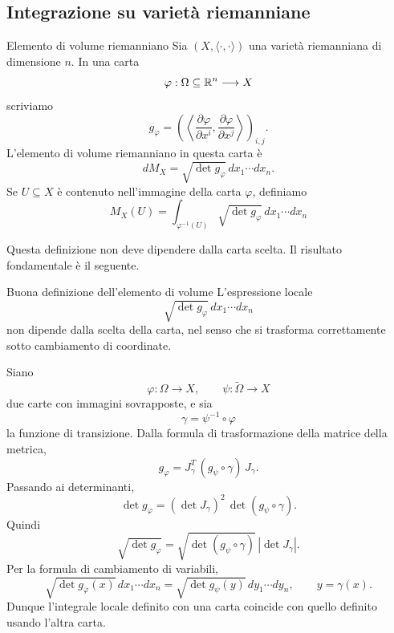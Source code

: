 \documentclass[a4paper]{article}
\begin{document}
\subsection{Integrazione su varietà riemanniane}

\begin{snippetdefinition}{Elemento di volume riemanniano}
Sia \((X,\langle\cdot,\cdot\rangle)\) una varietà riemanniana di dimensione \(n\). In una carta
\[
    \varphi:\Omega\subseteq\mathbb{R}^n\longrightarrow X
\]
scriviamo
\[
    g_\varphi
    =
    \left(
        \left\langle
            \frac{\partial\varphi}{\partial x^i},
            \frac{\partial\varphi}{\partial x^j}
        \right\rangle
    \right)_{i,j}.
\]
L'elemento di volume riemanniano in questa carta è
\[
    dM_X
    =
    \sqrt{\det g_\varphi}\,dx_1\cdots dx_n.
\]
Se \(U\subseteq X\) è contenuto nell'immagine della carta \(\varphi\), definiamo
\[
    M_X(U)
    =
    \int_{\varphi^{-1}(U)} \sqrt{\det g_\varphi}\,dx_1\cdots dx_n
\]
\end{snippetdefinition}

Questa definizione non deve dipendere dalla carta scelta. Il risultato fondamentale è il seguente.

\begin{snippetproposition}{Buona definizione dell'elemento di volume}
L'espressione locale
\[
    \sqrt{\det g_\varphi}\,dx_1\cdots dx_n
\]
non dipende dalla scelta della carta, nel senso che si trasforma correttamente sotto cambiamento di coordinate.
\end{snippetproposition}

\begin{snippetproof}{}
Siano
\[
    \varphi:\Omega\longrightarrow X,
    \qquad
    \psi:\widetilde{\Omega}\longrightarrow X
\]
due carte con immagini sovrapposte, e sia
\[
    \gamma=\psi^{-1}\circ\varphi
\]
la funzione di transizione. Dalla formula di trasformazione della matrice della metrica,
\[
    g_\varphi
    =
    J_\gamma^T\,(g_\psi\circ\gamma)\,J_\gamma.
\]
Passando ai determinanti,
\[
    \det g_\varphi
    =
    (\det J_\gamma)^2\,
    \det(g_\psi\circ\gamma).
\]
Quindi
\[
    \sqrt{\det g_\varphi}
    =
    \sqrt{\det(g_\psi\circ\gamma)}\,\left|\det J_\gamma\right|.
\]
Per la formula di cambiamento di variabili,
\[
    \sqrt{\det g_\varphi(x)}\,dx_1\cdots dx_n
    =
    \sqrt{\det g_\psi(y)}\,dy_1\cdots dy_n,
    \qquad
    y=\gamma(x).
\]
Dunque l'integrale locale definito con una carta coincide con quello definito usando l'altra carta.
\end{snippetproof}
\end{document}

